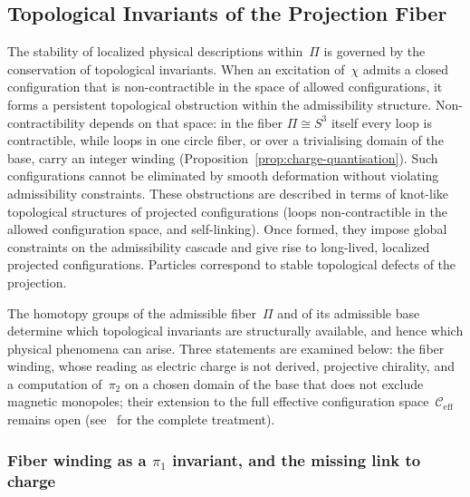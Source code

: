 \subsection{Topological Invariants of the Projection Fiber}
  \label{sec:topological-constraints}

  The stability of localized physical descriptions within~$\Pi$ is governed
  by the conservation of topological invariants.
  When an excitation of~$\chi$ admits a closed configuration that is
  non-contractible in the space of allowed configurations, it forms a persistent topological obstruction within the
  admissibility structure.
  Non-contractibility depends on that space: in the fiber $\Pi \cong S^3$ itself every loop is contractible, while
  loops in one circle fiber, or over a trivialising domain of the base, carry an integer winding
  (Proposition~\ref{prop:charge-quantisation}).
  Such configurations cannot be eliminated by smooth deformation without
  violating admissibility constraints.
  These obstructions are described in terms of knot-like topological structures of projected
  configurations (loops non-contractible in the allowed configuration space, and self-linking).
  Once formed, they impose global constraints on the admissibility cascade and
  give rise to long-lived, localized projected configurations.
  Particles correspond to stable topological defects of the projection.

  The homotopy groups of the admissible fiber~$\Pi$ and of its admissible
  base determine which topological invariants are structurally available,
  and hence which physical phenomena can arise.
  Three statements are examined below: the fiber winding, whose reading as electric charge is not derived,
  projective chirality, and a
  computation of~$\pi_2$ on a chosen domain of the base that does not exclude magnetic monopoles;
  their extension to the full effective configuration space~$\mathcal{C}_{\mathrm{eff}}$
  remains open (see~\cite{Beau2026k} for the complete treatment).

  \subsubsection*{Fiber winding as a $\pi_1$ invariant, and the missing link to charge}
    \label{sec:charge-quantisation-pi1}


